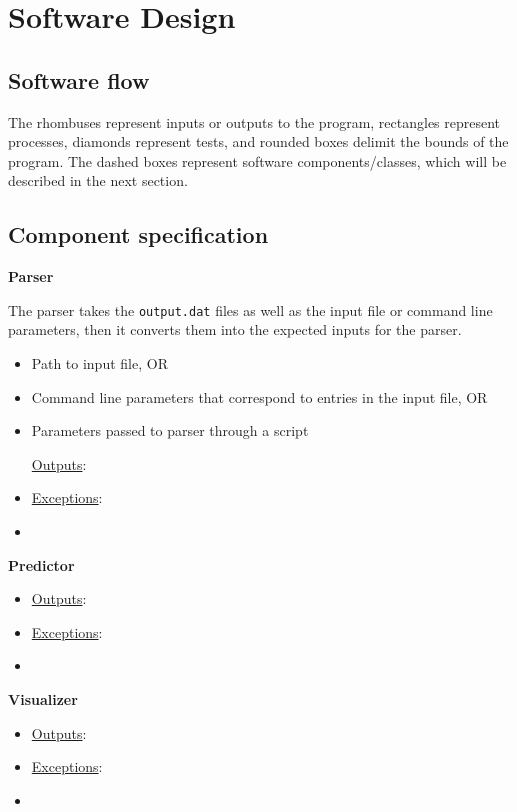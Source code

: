 \documentclass[paper=a4, fontsize=12pt]{article}
\begin{document}

\section*{Software Design}

\newpage

\subsection*{Software flow}



The rhombuses represent inputs or outputs to the program,
rectangles represent processes,
diamonds represent tests,
and rounded boxes delimit the bounds of the program.
The dashed boxes represent software components/classes, which will be described in the next section.

\subsection*{Component specification}

{\noindent \large \textbf{Parser} }

The parser takes the \texttt{output.dat} files as well as the input file or command line parameters,
then it converts them into the expected inputs for the parser. 

\begin{itemize}
  \underline{Possible Inputs}:
  \item Path to input file, OR
  \item Command line parameters that correspond to entries in the input file, OR
  \item Parameters passed to parser through a script

  \underline{Outputs}:
  \item 

  \underline{Exceptions}:
  \item
\end{itemize}


{\noindent \large \textbf{Predictor} }


\begin{itemize}
  \underline{Possible Inputs}:
  \item 

  \underline{Outputs}:
  \item 

  \underline{Exceptions}:
  \item
\end{itemize}

{\noindent \large \textbf{Visualizer} }


\begin{itemize}
  \underline{Possible Inputs}:
  \item 

  \underline{Outputs}:
  \item 

  \underline{Exceptions}:
  \item
\end{itemize}
\end{document}
